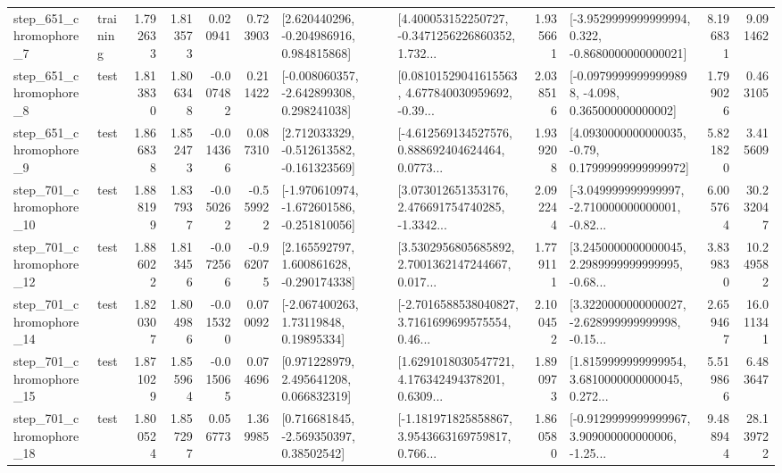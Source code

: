 \begin{tabular}{llrrrrllrlrr}
   step\_651\_chromophore\_7 &  training &      1.792633 &    1.813573 &      0.020941 &  0.723903 &    [2.620440296, -0.204986916, 0.984815868] &  [4.400053152250727, -0.3471256226860352, 1.732... &       1.935661 &  [-3.9529999999999994, 0.322, -0.8680000000000021] &            8.196831 &          9.091462 \\
   step\_651\_chromophore\_8 &      test &      1.813830 &    1.806348 &     -0.007482 &  0.211422 &   [-0.008060357, -2.642899308, 0.298241038] &  [0.08101529041615563, 4.677840030959692, -0.39... &       2.038516 &  [-0.09799999999999898, -4.098, 0.365000000000002] &            1.799026 &          0.463105 \\
   step\_651\_chromophore\_9 &      test &      1.866838 &    1.852473 &     -0.014366 &  0.087310 &   [2.712033329, -0.512613582, -0.161323569] &  [-4.612569134527576, 0.888692404624464, 0.0773... &       1.939208 &   [4.0930000000000035, -0.79, 0.17999999999999972] &            5.821820 &          3.415609 \\
  step\_701\_chromophore\_10 &      test &      1.888199 &    1.837937 &     -0.050262 & -0.559922 &  [-1.970610974, -1.672601586, -0.251810056] &  [3.073012651353176, 2.476691754740285, -1.3342... &       2.092244 &  [-3.049999999999997, -2.710000000000001, -0.82... &            6.005764 &         30.232047 \\
  step\_701\_chromophore\_12 &      test &      1.886022 &    1.813456 &     -0.072566 & -0.962075 &    [2.165592797, 1.600861628, -0.290174338] &  [3.5302956805685892, 2.7001362147244667, 0.017... &       1.779111 &  [3.2450000000000045, 2.2989999999999995, -0.68... &            3.839830 &         10.249582 \\
  step\_701\_chromophore\_14 &      test &      1.820307 &    1.804986 &     -0.015320 &  0.070092 &      [-2.067400263, 1.73119848, 0.19895334] &  [-2.7016588538040827, 3.7161699699575554, 0.46... &       2.100452 &  [3.3220000000000027, -2.628999999999998, -0.15... &            2.659467 &         16.011341 \\
  step\_701\_chromophore\_15 &      test &      1.871029 &    1.855964 &     -0.015065 &  0.074696 &     [0.971228979, 2.495641208, 0.066832319] &  [1.6291018030547721, 4.176342494378201, 0.6309... &       1.890973 &  [1.8159999999999954, 3.6810000000000045, 0.272... &            5.519866 &          6.483647 \\
  step\_701\_chromophore\_18 &      test &      1.800524 &    1.857297 &      0.056773 &  1.369985 &     [0.716681845, -2.569350397, 0.38502542] &  [-1.181971825858867, 3.9543663169759817, 0.766... &       1.860580 &  [-0.9129999999999967, 3.909000000000006, -1.25... &            9.488944 &         28.139722 \\

\end{tabular}

